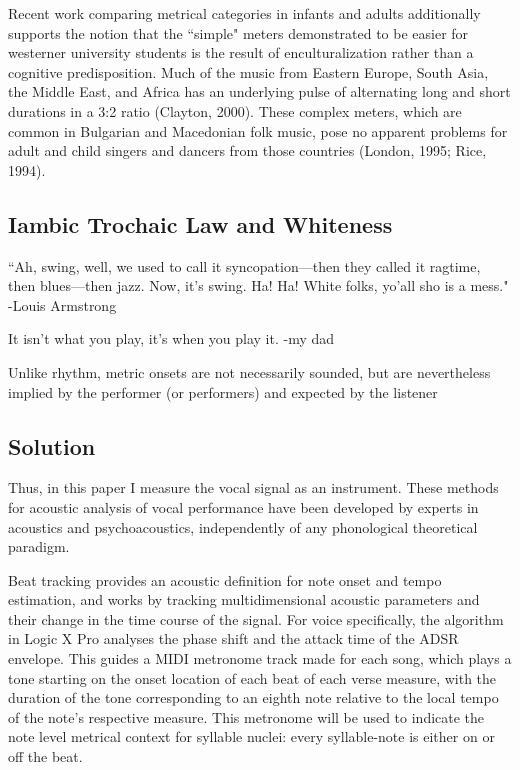 Recent work comparing metrical categories in infants and adults additionally supports the notion that the ``simple" meters demonstrated to be easier for westerner university students is the result of enculturalization rather than a cognitive predisposition. 
Much of the music from Eastern Europe, South Asia, the Middle East, and Africa has an underlying pulse of alternating long and short durations in a 3:2 ratio (Clayton, 2000). These complex meters, which are common in Bulgarian and Macedonian folk music, pose no apparent problems for adult and child singers and dancers from those countries (London, 1995; Rice, 1994). \citep{hannon2005}



\subsection{Iambic Trochaic Law and Whiteness}

``Ah, swing, well, we used to call it syncopation—then they called it ragtime, then blues—then jazz. Now, it's swing. Ha! Ha! White folks, yo'all sho is a mess." -Louis Armstrong

It isn't what you play, it's when you play it. -my dad



Unlike rhythm, metric onsets are not necessarily sounded, but are nevertheless implied by the performer (or performers) and expected by the listener





\subsection{Solution}

Thus, in this paper I measure the vocal signal as an instrument. These methods for acoustic analysis of vocal performance have been developed by experts in acoustics and psychoacoustics, independently of any phonological theoretical paradigm. 




Beat tracking provides an acoustic definition for note onset and tempo estimation, and works by tracking multidimensional acoustic parameters and their change in the time course of the signal. For voice specifically, the algorithm in Logic X Pro analyses the phase shift and the attack time of the ADSR envelope. This guides a MIDI metronome track made for each song, which plays a tone starting on the onset location of each beat of each verse measure, with the duration of the tone corresponding to an eighth note relative to the local tempo of the note's respective measure. This metronome will be used to indicate the note level metrical context for syllable nuclei: every syllable-note is either on or off the beat.


